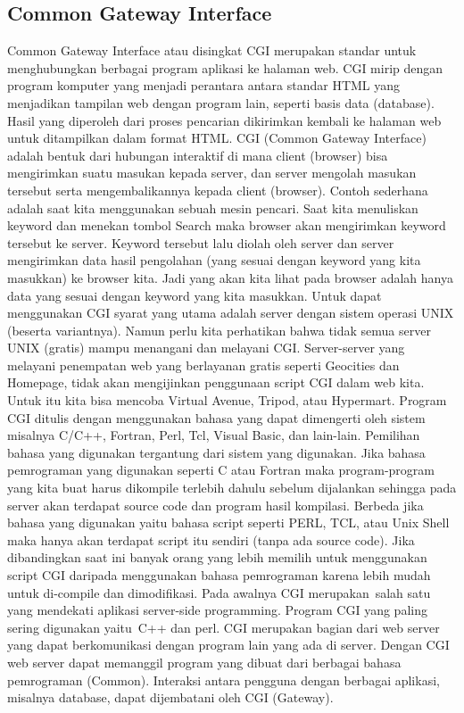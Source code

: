 \subsection{Common Gateway Interface}
Common Gateway Interface atau disingkat CGI merupakan standar untuk menghubungkan berbagai program aplikasi ke halaman web. CGI mirip dengan program komputer yang menjadi perantara antara standar HTML yang menjadikan tampilan web dengan program lain, seperti basis data (database). Hasil yang diperoleh dari proses pencarian dikirimkan kembali ke halaman web untuk ditampilkan dalam format HTML. CGI (Common Gateway Interface) adalah bentuk dari hubungan interaktif di mana client (browser) bisa mengirimkan suatu masukan kepada server, dan server mengolah masukan tersebut serta mengembalikannya kepada client (browser). Contoh sederhana adalah saat kita menggunakan sebuah mesin pencari. Saat kita menuliskan keyword dan menekan tombol Search maka browser akan mengirimkan keyword tersebut ke server. Keyword tersebut lalu diolah oleh server dan server mengirimkan data hasil pengolahan (yang sesuai dengan keyword yang kita masukkan) ke browser kita. Jadi yang akan kita lihat pada browser adalah  hanya data yang sesuai dengan keyword yang kita masukkan. 
Untuk dapat menggunakan CGI syarat yang utama adalah server dengan sistem operasi UNIX (beserta variantnya). Namun perlu kita perhatikan bahwa tidak semua server UNIX (gratis) mampu menangani dan melayani CGI. Server-server yang melayani penempatan web yang berlayanan gratis seperti Geocities dan Homepage, tidak akan mengijinkan penggunaan script CGI dalam web kita. Untuk itu kita bisa mencoba Virtual Avenue, Tripod, atau Hypermart.
	Program CGI ditulis dengan menggunakan bahasa yang dapat dimengerti oleh sistem misalnya C/C++, Fortran, Perl, Tcl, Visual Basic, dan lain-lain. Pemilihan bahasa yang digunakan tergantung dari sistem yang digunakan. Jika bahasa pemrograman yang digunakan seperti C atau Fortran maka program-program yang kita buat harus dikompile terlebih dahulu sebelum dijalankan sehingga pada server akan terdapat source code dan program hasil kompilasi. Berbeda jika bahasa yang digunakan yaitu bahasa script seperti PERL, TCL, atau Unix Shell maka hanya akan terdapat script itu sendiri (tanpa ada source code). Jika dibandingkan saat ini banyak orang yang lebih memilih untuk menggunakan script CGI daripada menggunakan bahasa pemrograman karena lebih mudah untuk di-compile dan dimodifikasi.  
	Pada awalnya CGI merupakan~salah satu yang mendekati aplikasi server-side programming.  Program CGI yang paling sering digunakan yaitu~C++ dan perl.  CGI merupakan bagian dari web server yang dapat berkomunikasi dengan program lain yang ada di server. Dengan CGI web server dapat memanggil program yang dibuat dari berbagai bahasa pemrograman (Common). Interaksi antara pengguna dengan berbagai aplikasi, misalnya database, dapat dijembatani oleh CGI (Gateway). 
